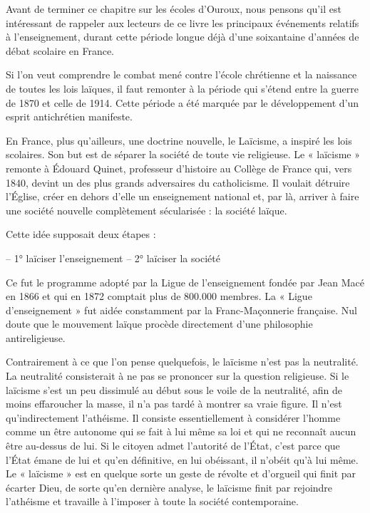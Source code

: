 Avant de terminer ce chapitre sur les écoles d'Ouroux, nous pensons qu'il est intéressant de rappeler aux lecteurs de ce livre les principaux événements relatifs à l'enseignement, durant cette période longue déjà d'une soixantaine d'années de débat scolaire en France.

Si l'on veut comprendre le combat mené contre l'école chrétienne et la naissance de toutes les lois laïques, il faut remonter à la période qui s'étend entre la guerre de 1870 et celle de 1914. Cette période a été marquée par le développement d'un esprit antichrétien manifeste.

En France, plus qu'ailleurs, une doctrine nouvelle, le Laïcisme, a inspiré les lois scolaires. Son but est de séparer la société de toute vie religieuse. Le « laïcisme » remonte à Édouard Quinet, professeur d'histoire au Collège de France qui, vers 1840, devint un des plus grands adversaires du catholicisme. Il voulait détruire l'Église, créer en dehors d'elle un enseignement national et, par là, arriver à faire une société nouvelle complètement sécularisée : la société laïque.

Cette idée supposait deux étapes :

– 1° laïciser l'enseignement  
– 2° laïciser la société

Ce fut le programme adopté par la Ligue de l'enseignement fondée par Jean Macé en 1866 et qui en 1872 comptait plus de 800.000 membres. La « Ligue d'enseignement » fut aidée constamment par la Franc-Maçonnerie française. Nul doute que le mouvement laïque procède directement d'une philosophie antireligieuse.

Contrairement à ce que l'on pense quelquefois, le laïcisme n'est pas la neutralité. La neutralité consisterait à ne pas se prononcer sur la question religieuse. Si le laïcisme s'est un peu dissimulé au début sous le voile de la neutralité, afin de moins effaroucher la masse, il n'a pas tardé à montrer sa vraie figure. Il n'est qu'indirectement l'athéisme. Il consiste essentiellement à considérer l'homme comme un être autonome qui se fait à lui même sa loi et qui ne reconnaît aucun être au-dessus de lui. Si le citoyen admet l'autorité de l'État, c'est parce que l'État émane de lui et qu'en définitive, en lui obéissant, il n'obéit qu'à lui même. Le « laïcisme » est en quelque sorte un geste de révolte et d'orgueil qui finit par écarter Dieu, de sorte qu'en dernière analyse, le laïcisme finit par rejoindre l'athéisme et travaille à l'imposer à toute la société contemporaine.

